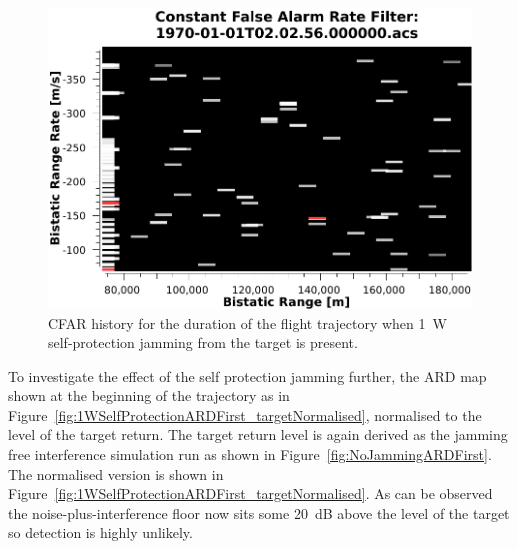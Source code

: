 \documentclass[conference]{IEEEtran}
\begin{document}
\begin{figure}[htbp]
\begin{center}
\includegraphics[width=1.0\columnwidth]{figs/Simulations/1WSelfProtectionCFAR.pdf}
\caption[CFAR 1~W self-protection jamming from the target. ]{CFAR history for the duration of the flight trajectory when 1~W self-protection jamming from the target is present.}
\label{fig:1WSelfProtectionCFAR}
\end{center}
\end{figure}

To investigate the effect of the self protection jamming further,  the ARD map shown at the beginning of the trajectory as in Figure~\ref{fig:1WSelfProtectionARDFirst_targetNormalised}, normalised to the level of the target return. The target return level is again derived as the jamming free interference simulation run as shown in Figure~\ref{fig:NoJammingARDFirst}. The normalised version  is shown in Figure~\ref{fig:1WSelfProtectionARDFirst_targetNormalised}. As can be observed the noise-plus-interference floor now sits some 20~dB above the level of the target so detection is highly unlikely.
\end{document}
